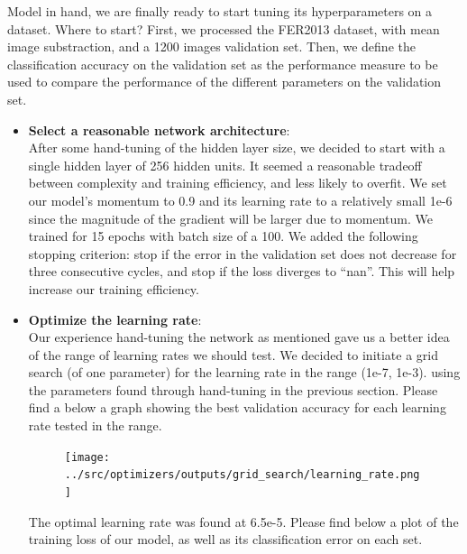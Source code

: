 Model in hand, we are finally ready to start tuning its hyperparameters on a dataset.
Where to start?
First, we processed the FER2013 dataset, with mean image substraction, and a 1200 images validation set.
Then, we define the classification accuracy on the validation set as
the performance measure to be used to compare the performance of the different parameters on the validation set.

\begin{itemize}[topsep=-10pt]
\item \textbf{Select a reasonable network architecture}:\\
  After some hand-tuning of the hidden layer size, we decided to start with a single hidden layer of 256 hidden units.
  It seemed a reasonable tradeoff between complexity and training efficiency, and less likely to overfit.
  We set our model's momentum to 0.9 and its learning rate to a relatively small 1e-6
  since the magnitude of the gradient will be larger due to momentum.
  We trained for 15 epochs with batch size of a 100.
  We added the following stopping criterion: stop if the error in the validation set does not decrease for three consecutive cycles,
  and stop if the loss diverges to ``nan''.
  This will help increase our training efficiency.

\item \textbf{Optimize the learning rate}:\\
  Our experience hand-tuning the network as mentioned gave us a better idea of the range of learning rates we should test.
  We decided to initiate a grid search (of one parameter) for the learning rate in the range (1e-7, 1e-3).
  using the parameters found through hand-tuning in the previous section.
  Please find a below a graph showing the best validation accuracy for each learning rate tested in the range.
  \begin{figure}[!ht]
      \centering
      {{\texttt{[image: ../src/optimizers/outputs/grid\_search/learning\_rate.png]}}}
  \end{figure}

  The optimal learning rate was found at 6.5e-5.
  Please find below a plot of the training loss of our model, as well as its classification error on each set.
  


\end{itemize}
